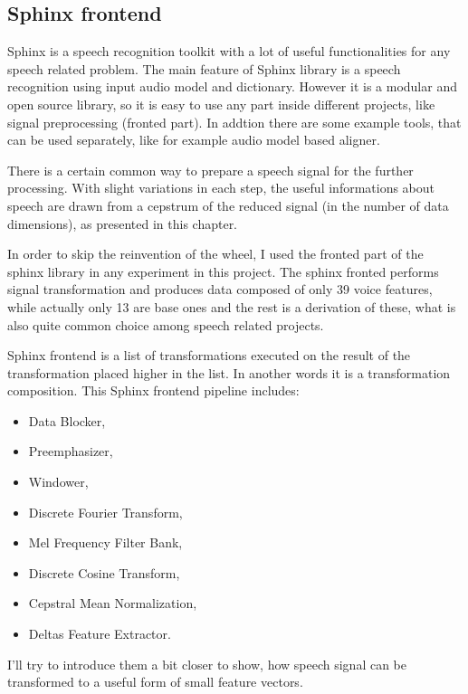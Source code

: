 \documentclass[12pt,a4paper,english]{article}
\begin{document}
\newpage
\subsection{Sphinx frontend}


Sphinx is a speech recognition toolkit with a lot of useful functionalities for any speech related problem.  \newline
The main feature of Sphinx library is a speech recognition using input audio model and dictionary. However it is a modular and open source library,
so it is easy to use any part inside different projects, like signal preprocessing (fronted part). In addtion there are some example tools, that can be used separately, like
for example audio model based aligner. \newline

There is a certain common way to prepare a speech signal for the further processing. With slight variations in each step, the useful informations about speech are drawn from a cepstrum of the reduced signal (in the number of data dimensions), as presented in this chapter. \newline

In order to skip the reinvention of the wheel, I used the fronted part of the sphinx library in any experiment in this project.
The sphinx fronted performs signal transformation and produces data composed of only 39 voice features,
while actually only 13 are base ones and the rest is a derivation of these, what is also quite common choice among speech related projects. \newline

Sphinx frontend is a list of transformations executed on the result of the transformation placed higher in the list.
In another words it is a transformation composition. \newline
\newline
This Sphinx frontend pipeline includes: \newline
\begin{itemize}
	\item Data Blocker,
	\item Preemphasizer,
	\item Windower,
	\item Discrete Fourier Transform,
	\item Mel Frequency Filter Bank,
	\item Discrete Cosine Transform,
	\item Cepstral Mean Normalization,
	\item Deltas Feature Extractor.
\end{itemize}
I'll try to introduce them a bit closer to show, how speech signal can be transformed to a useful form of small feature vectors.
\end{document}
